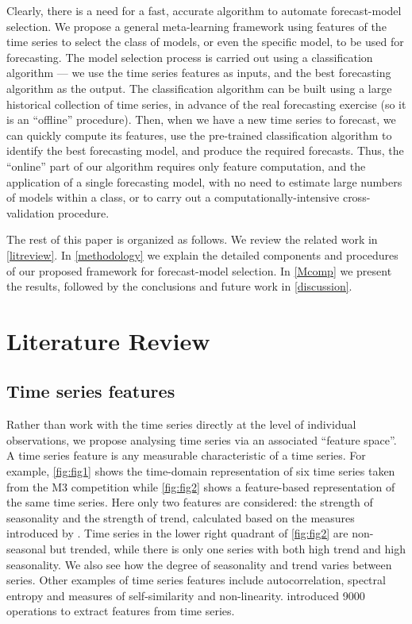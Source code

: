 \documentclass[11pt,a4paper,]{article}
\theoremstyle{definition}
\theoremstyle{definition}
\theoremstyle{definition}
\theoremstyle{remark}
\begin{document}
Clearly, there is a need for a fast, accurate algorithm to automate
forecast-model selection. We propose a general meta-learning framework
using features of the time series to select the class of models, or even
the specific model, to be used for forecasting. The model selection
process is carried out using a classification algorithm --- we use the
time series features as inputs, and the best forecasting algorithm as
the output. The classification algorithm can be built using a large
historical collection of time series, in advance of the real forecasting
exercise (so it is an ``offline'' procedure). Then, when we have a new
time series to forecast, we can quickly compute its features, use the
pre-trained classification algorithm to identify the best forecasting
model, and produce the required forecasts. Thus, the ``online'' part of
our algorithm requires only feature computation, and the application of
a single forecasting model, with no need to estimate large numbers of
models within a class, or to carry out a computationally-intensive
cross-validation procedure.

The rest of this paper is organized as follows. We review the related
work in \autoref{litreview}. In \autoref{methodology} we explain the
detailed components and procedures of our proposed framework for
forecast-model selection. In \autoref{Mcomp} we present the results,
followed by the conclusions and future work in \autoref{discussion}.

\section{Literature Review}\label{litreview}

\subsection{Time series features}\label{time-series-features}

Rather than work with the time series directly at the level of
individual observations, we propose analysing time series via an
associated ``feature space''. A time series feature is any measurable
characteristic of a time series. For example, \autoref{fig:fig1} shows
the time-domain representation of six time series taken from the M3
competition \autocite{makridakis2000m3} while \autoref{fig:fig2} shows a
feature-based representation of the same time series. Here only two
features are considered: the strength of seasonality and the strength of
trend, calculated based on the measures introduced by
\textcite{wang2009rule}. Time series in the lower right quadrant of
\autoref{fig:fig2} are non-seasonal but trended, while there is only one
series with both high trend and high seasonality. We also see how the
degree of seasonality and trend varies between series. Other examples of
time series features include autocorrelation, spectral entropy and
measures of self-similarity and non-linearity.
\textcite{fulcher2014highly} introduced 9000 operations to extract
features from time series.
\end{document}
